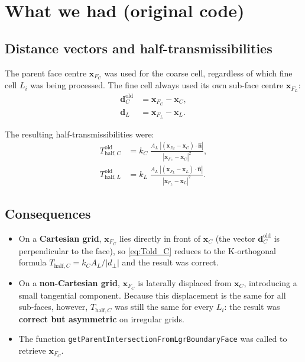 \documentclass[11pt,a4paper]{article}
\begin{document}
\section{What we had (original code)}

\subsection*{Distance vectors and half-transmissibilities}

The parent face centre $\mathbf{x}_{F_C}$ was used for the coarse cell,
regardless of which fine cell $L_i$ was being processed.  The fine cell
always used its own sub-face centre $\mathbf{x}_{F_L}$:
\begin{align}
  \mathbf{d}_C^{\text{old}} &= \mathbf{x}_{F_C} - \mathbf{x}_C, \\[4pt]
  \mathbf{d}_L              &= \mathbf{x}_{F_L} - \mathbf{x}_L.
\end{align}

The resulting half-transmissibilities were:
\begin{align}
  T_{\text{half},C}^{\text{old}}
    &= k_C\;\frac{A_L\;
       |(\mathbf{x}_{F_C}-\mathbf{x}_C)\cdot\hat{\mathbf{n}}|}
       {|\mathbf{x}_{F_C}-\mathbf{x}_C|^{2}},
  \label{eq:Told_C}\\[6pt]
  T_{\text{half},L}^{\text{old}}
    &= k_L\;\frac{A_L\;
       |(\mathbf{x}_{F_L}-\mathbf{x}_L)\cdot\hat{\mathbf{n}}|}
       {|\mathbf{x}_{F_L}-\mathbf{x}_L|^{2}}.
  \label{eq:Told_L}
\end{align}

\subsection*{Consequences}

\begin{itemize}
  \item On a \textbf{Cartesian grid}, $\mathbf{x}_{F_C}$ lies directly
        in front of $\mathbf{x}_C$ (the vector $\mathbf{d}_C^{\text{old}}$
        is perpendicular to the face), so \eqref{eq:Told_C} reduces to the
        K-orthogonal formula $T_{\text{half},C} = k_C A_L / |d_\perp|$
        and the result was correct.
  \item On a \textbf{non-Cartesian grid}, $\mathbf{x}_{F_C}$ is
        laterally displaced from $\mathbf{x}_C$, introducing a small
        tangential component.  Because this displacement is the same for
        all sub-faces, however, $T_{\text{half},C}$ was still the same
        for every $L_i$: the result was \textbf{correct but asymmetric}
        on irregular grids.
  \item The function \texttt{getParentIntersectionFromLgrBoundaryFace}
        was called to retrieve $\mathbf{x}_{F_C}$.
\end{itemize}
\end{document}
